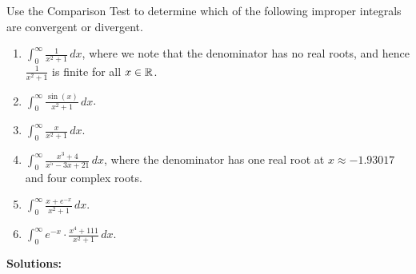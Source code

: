 \bigskip

\begin{example} 
\label{ex:ComparisonTest01}
Use the Comparison Test to determine which of the following improper integrals are convergent or divergent.
\begin{enumerate}
\renewcommand{\labelenumi}{(\alph{enumi})}
\setlength{\itemsep}{.2cm}
    \item $\int_0^\infty \frac{1}{x^2 + 1} \, dx$, where we note that the denominator has no real roots, and hence $\frac{1}{x^2 + 1}$ is finite for all $x\in \mathbb R$.
    \item $\int_0^\infty \frac{\sin(x)}{x^2 + 1} \, dx$.
    \item $\int_0^\infty \frac{x}{x^2 + 1} \, dx$.
    \item $\int_0^\infty \frac{x^3 + 4}{x^5 - 3x +21} \, dx$, where the denominator has one real root at $ x \approx -1.93017$ and four complex roots.
    \item $\int_0^\infty \frac{x + e^{-x}}{x^2 + 1} \, dx$.
    \item $\int_0^\infty e^{-x} \cdot\frac{x^4 + 111}{x^2 + 1} \, dx$.
 \end{enumerate}    
\end{example}
\textbf{Solutions:}

